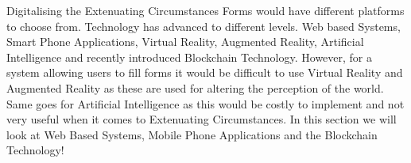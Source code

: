 \documentclass[../main.tex]{subfiles}
\begin{document}
\raggedright
Digitalising the Extenuating Circumstances Forms would have different platforms to choose from. Technology has advanced to different levels. Web based Systems, Smart Phone Applications, Virtual Reality, Augmented Reality, Artificial Intelligence\cite{forbestop7} and recently introduced Blockchain Technology. However, for a system allowing users to fill forms it would be difficult to use Virtual Reality and Augmented Reality as these are used for altering the perception of the world\cite{arvr}. Same goes for Artificial Intelligence as this would be costly to implement and not very useful when it comes to Extenuating Circumstances. In this section we will look at Web Based Systems, Mobile Phone Applications and the Blockchain Technology!
\end{document}
